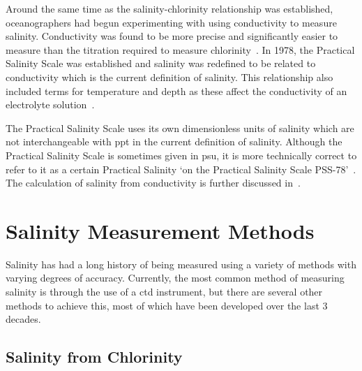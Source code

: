 Around the same time as the salinity-chlorinity relationship was established, oceanographers had begun experimenting with using conductivity to measure salinity.
Conductivity was found to be more precise and significantly easier to measure than the titration required to measure chlorinity~\cite{lewis_salinity_definition_and_calculation_1978}.
In 1978, the Practical Salinity Scale was established and salinity was redefined to be related to conductivity which is the current definition of salinity\cite{lewis_salinity_definition_and_calculation_1978}.
This relationship also included terms for temperature and depth as these affect the conductivity of an electrolyte solution~\cite{zheng_electrical_conductivity_of_ocean_2017}.

The Practical Salinity Scale uses its own dimensionless units of salinity which are not interchangeable with \gls{ppt} in the current definition of salinity.
Although the Practical Salinity Scale is sometimes given in \gls{psu}, it is more technically correct to refer to it as a certain Practical Salinity `on the Practical Salinity Scale PSS-78'~\cite{lewis_salinity_definition_and_calculation_1978}.
The calculation of salinity from conductivity is further discussed in~.


\section{Salinity Measurement Methods}\label{sec:salinity-measurement-techniques}

Salinity has had a long history of being measured using a variety of methods with varying degrees of accuracy.
Currently, the most common method of measuring salinity is through the use of a \gls{ctd} instrument, but there are several other methods to achieve this, most of which have been developed over the last 3 decades.

\subsection{Salinity from Chlorinity}\label{subsec:salinity-from-chlorinity}

